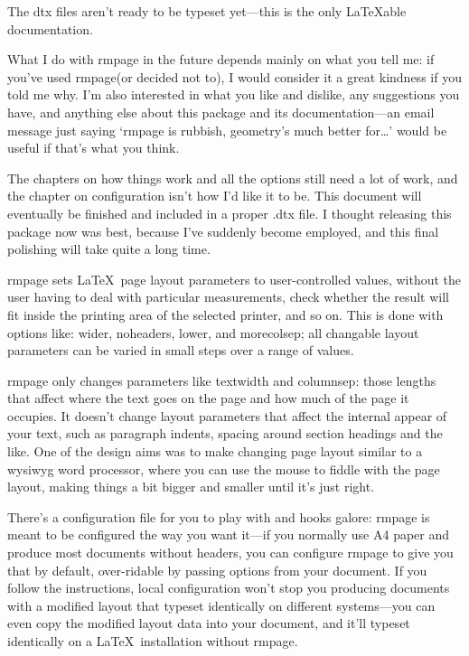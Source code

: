 \documentclass[11pt,loose,twoside,touchwider,longish,
                      noheaders,a4paper,notstdmargins]{report}
\newcommand*{\filename}[1]{{\ttfamily #1}}
\newcommand*{\packname}[1]{{\sffamily #1}}
\DeclareRobustCommand*{\comname}[1]{{\ttfamily\makeatletter\bs #1\makeatother}}
\newcommand*{\classname}[1]{{\ttfamily #1}}
\newcommand*{\optname}[1]{{\ttfamily #1}}
\newcommand*{\rmpage}{\classname{rmpage}\xspace}
\begin{document}
The \filename{dtx} files aren't ready to be typeset yet---this is the
only \LaTeX able documentation.

What I do with \rmpage in the future depends mainly on what you tell
me: if you've used \rmpage (or decided not to), I would consider it a
great kindness if you told me why.  I'm also interested in what you
like and dislike, any suggestions you have, and anything else about
this package and its documentation---an email message just saying
`\rmpage is rubbish, \packname{geometry}'s much better for\ldots'
would be useful if that's what you think.

The chapters on how things work and all the options still need a lot
of work, and the chapter on configuration isn't how I'd like it to be.
This document will eventually be finished and included in a proper
\filename{.dtx} file.  I thought releasing this package now was best,
because I've suddenly become employed, and this final polishing will
take quite a long time.

\rmpage sets \LaTeX\ page layout parameters to user-controlled
values, without the user having to deal with particular measurements,
check whether the result will fit inside the printing area of the
selected printer, and so on.  This is done with options like:
\optname{wider}, \optname{noheaders}, \optname{lower}, and
\optname{morecolsep}; all changable layout parameters can be varied
in small steps over a range of values.

\rmpage only changes parameters like \comname{textwidth} and
\comname{columnsep}: those lengths that affect where the text goes on
the page and how much of the page it occupies.  It doesn't change
layout parameters that affect the internal appear of your text, such
as paragraph indents, spacing around section headings and the like.
One of the design aims was to make changing page layout similar to a
wysiwyg word processor, where you can use the mouse to fiddle with the
page layout, making things a bit bigger and smaller until it's just
right.

There's a configuration file for you to play with and hooks galore:
\rmpage is meant to be configured the way you want it---if you
normally use A4 paper and produce most documents without headers, you
can configure \rmpage to give you that by default, over-ridable by
passing options from your document.  If you follow the instructions,
local configuration won't stop you producing documents with a modified
layout that typeset identically on different systems---you can even
copy the modified layout data into your document, and it'll typeset
identically on a \LaTeX\ installation without \rmpage.
\end{document}
